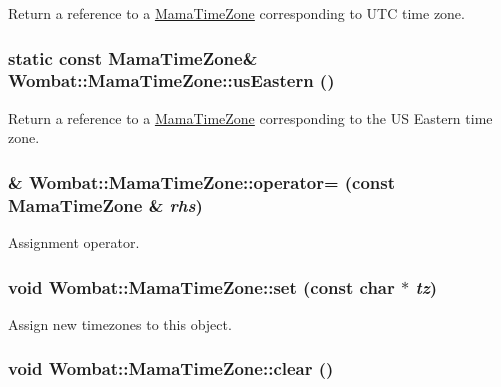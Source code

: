 Return a reference to a \hyperlink{classWombat_1_1MamaTimeZone}{MamaTimeZone} corresponding to UTC time zone. \hypertarget{classWombat_1_1MamaTimeZone_adb315698d116e1cd88897ed08ffa5d27}{
\subsubsection[{usEastern}]{\setlength{\rightskip}{0pt plus 5cm}static const {\bf MamaTimeZone}\& Wombat::MamaTimeZone::usEastern ()}}
\label{classWombat_1_1MamaTimeZone_adb315698d116e1cd88897ed08ffa5d27}


Return a reference to a \hyperlink{classWombat_1_1MamaTimeZone}{MamaTimeZone} corresponding to the US Eastern time zone. \hypertarget{classWombat_1_1MamaTimeZone_a8d33239cb78b37ea4f7335d93a41e32e}{
\subsubsection[{operator=}]{\& Wombat::MamaTimeZone::operator= (const {\bf MamaTimeZone} \& {\em rhs})}}
\label{classWombat_1_1MamaTimeZone_a8d33239cb78b37ea4f7335d93a41e32e}


Assignment operator. \hypertarget{classWombat_1_1MamaTimeZone_a70233754ac2c4450cd5a696d28b4ca64}{
\subsubsection[{set}]{\setlength{\rightskip}{0pt plus 5cm}void Wombat::MamaTimeZone::set (const char $\ast$ {\em tz})}}
\label{classWombat_1_1MamaTimeZone_a70233754ac2c4450cd5a696d28b4ca64}


Assign new timezones to this object. \hypertarget{classWombat_1_1MamaTimeZone_af46c9f37ed28148d714a42dc75726072}{
\subsubsection[{clear}]{\setlength{\rightskip}{0pt plus 5cm}void Wombat::MamaTimeZone::clear ()}}
\label{classWombat_1_1MamaTimeZone_af46c9f37ed28148d714a42dc75726072}


